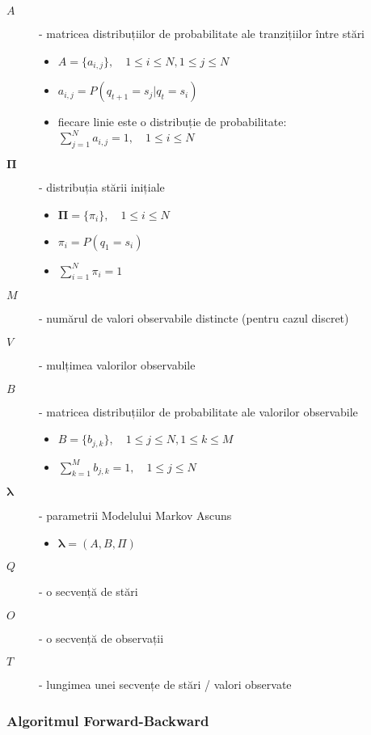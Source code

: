 \documentclass[12pt]{article}
\begin{document}
\begin{description}
\item[$A$] - matricea distribuțiilor de probabilitate ale tranzițiilor
  între stări
  \begin{itemize}
  \item $A=\lbrace a_{i,j} \rbrace, \quad 1 \le i \le N, 1 \le j \le
    N$
  \item $a_{i,j} = P(q_{t+1}=s_j \vert q_{t}=s_i)$
  \item fiecare linie este o distribuție de probabilitate:\\
    $\displaystyle\sum_{j=1}^{N}a_{i,j} = 1,\quad 1 \le i \le N$
  \end{itemize}
\item[$\mathbf{\Pi}$] - distribuția stării inițiale
  \begin{itemize}
  \item $\mathbf{\Pi} = \lbrace \pi_i \rbrace,\quad 1 \le i \le N$
  \item $\pi_i = P(q_1 = s_i)$
  \item $\displaystyle\sum_{i=1}^{N}\pi_i = 1$
  \end{itemize}
\item[$M$] - numărul de valori observabile distincte (pentru cazul
  discret)
\item[$V$] - mulțimea valorilor observabile
\item[$B$] - matricea distribuțiilor de probabilitate ale valorilor
  observabile
  \begin{itemize}
  \item $B=\lbrace b_{j,k} \rbrace, \quad 1 \le j \le N, 1 \le k \le
    M$
  \item $\displaystyle\sum_{k=1}^{M}b_{j,k} = 1,\quad 1 \le j \le N$
  \end{itemize}
\item[$\mathbf{\lambda}$] - parametrii Modelului Markov Ascuns
  \begin{itemize}
  \item $\mathbf{\lambda} = (A, B, \Pi)$
  \end{itemize}
\item[$Q$] - o secvență de stări
\item[$O$] - o secvență de observații
\item[$T$] - lungimea unei secvențe de stări / valori observate
\end{description}

\subsubsection{Algoritmul Forward-Backward}
\label{sec:fb-not}
\end{document}
